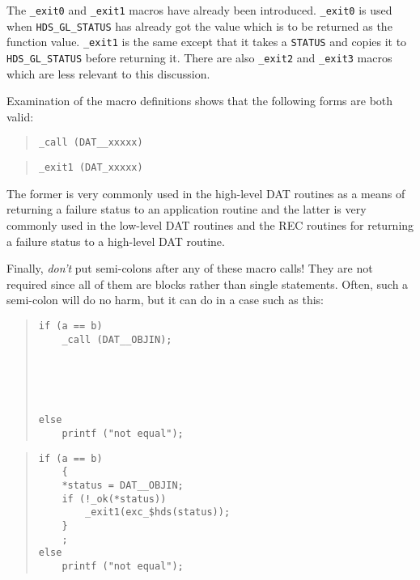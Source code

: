 The {\tt \_exit0} and {\tt \_exit1} macros have already been introduced.
{\tt \_exit0} is used when {\tt HDS\_GL\_STATUS} has already got the value
which is to be returned as the function value. {\tt \_exit1} is the same
except that it takes a {\tt STATUS} and copies it to {\tt HDS\_GL\_STATUS}
before returning it. There are also {\tt \_exit2} and {\tt \_exit3} macros
which are less relevant to this discussion.

Examination of the macro definitions shows that the following forms are
both valid:

\begin {minipage}[t]{80mm}
\begin {quote}
\begin {verbatim}
_call (DAT__xxxxx)
\end{verbatim}
\end {quote}
\end {minipage}
\begin {minipage}[t]{80mm}
\begin {quote}
\begin {verbatim}
_exit1 (DAT_xxxxx)
\end{verbatim}
\end {quote}
\end {minipage}

The former is very commonly used in the high-level DAT routines as a means of
returning a failure status to an application routine and the latter is very
commonly used in the low-level DAT routines and the REC routines for returning
a failure status to a high-level DAT routine.

Finally, {\em don't} put semi-colons after any of these macro calls! They
are not required since all of them are blocks rather than single statements.
Often, such a semi-colon will do no harm, but it can do in a case such
as this:

\begin {minipage}[t]{80mm}
\begin {quote}
\begin {verbatim}
if (a == b)
    _call (DAT__OBJIN);





else
    printf ("not equal");
\end{verbatim}
\end {quote}
\end {minipage}
\begin {minipage}[t]{80mm}
\begin {quote}
\begin {verbatim}
if (a == b)
    {
    *status = DAT__OBJIN;
    if (!_ok(*status))
        _exit1(exc_$hds(status));
    }
    ;
else
    printf ("not equal");
\end{verbatim}
\end {quote}
\end {minipage}

